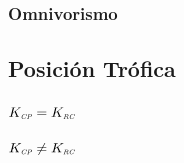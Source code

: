 
\subsubsection{Omnivorismo}





\subsection{Posici\'on Tr\'ofica}

\subsubsection{$K_{\textit{\tiny CP}} = K_{\textit{\tiny RC}}$}


\subsubsection{$K_{\textit{\tiny CP}} \not= K_{\textit{\tiny RC}}$}













